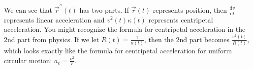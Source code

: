 \noindent
We can see that $\vec{r}^{\prime\prime}(t)$ has two parts. If $\vec{r}(t)$ represents position, then $\frac{\mathrm{d}v}{\mathrm{d}t}$ represents linear acceleration and $v^2(t)\kappa(t)$ represents centripetal acceleration.
You might recognize the formula for centripetal acceleration in the 2nd part from physics.
If we let $R(t) = \frac{1}{\kappa(t)}$, then the 2nd part becomes $\frac{v^2(t)}{R(t)}$, which looks exactly like the formula for centripetal acceleration for uniform circular motion: $a_c = \frac{v^2}{r}$.